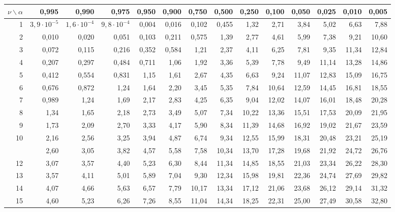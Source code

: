 \documentclass[12pt,a4paper]{article}
\begin{document}
\begin{center}
\footnotesize
\setlength{\tabcolsep}{2pt}
\begin{tabular*}{\linewidth}{@{\extracolsep{\fill}}rrrrrrrrrrrrrr@{}}
\toprule
$\nu \backslash \alpha$ & 0,995 & 0,990 & 0,975 & 0,950 & 0,900 & 0,750 & 0,500 & 0,250 & 0,100 & 0,050 & 0,025 & 0,010 & 0,005 \\
\midrule
1 & $3{,}9{\cdot}10^{-5}$ & $1{,}6{\cdot}10^{-4}$ & $9{,}8{\cdot}10^{-4}$ & 0,004 & 0,016 & 0,102 & 0,455 & 1,32 & 2,71 & 3,84 & 5,02 & 6,63 & 7,88 \\
2 & 0,010 & 0,020 & 0,051 & 0,103 & 0,211 & 0,575 & 1,39 & 2,77 & 4,61 & 5,99 & 7,38 & 9,21 & 10,60 \\
3 & 0,072 & 0,115 & 0,216 & 0,352 & 0,584 & 1,21 & 2,37 & 4,11 & 6,25 & 7,81 & 9,35 & 11,34 & 12,84 \\
4 & 0,207 & 0,297 & 0,484 & 0,711 & 1,06 & 1,92 & 3,36 & 5,39 & 7,78 & 9,49 & 11,14 & 13,28 & 14,86 \\
5 & 0,412 & 0,554 & 0,831 & 1,15 & 1,61 & 2,67 & 4,35 & 6,63 & 9,24 & 11,07 & 12,83 & 15,09 & 16,75 \\
6 & 0,676 & 0,872 & 1,24 & 1,64 & 2,20 & 3,45 & 5,35 & 7,84 & 10,64 & 12,59 & 14,45 & 16,81 & 18,55 \\
7 & 0,989 & 1,24 & 1,69 & 2,17 & 2,83 & 4,25 & 6,35 & 9,04 & 12,02 & 14,07 & 16,01 & 18,48 & 20,28 \\
8 & 1,34 & 1,65 & 2,18 & 2,73 & 3,49 & 5,07 & 7,34 & 10,22 & 13,36 & 15,51 & 17,53 & 20,09 & 21,95 \\
9 & 1,73 & 2,09 & 2,70 & 3,33 & 4,17 & 5,90 & 8,34 & 11,39 & 14,68 & 16,92 & 19,02 & 21,67 & 23,59 \\
10 & 2,16 & 2,56 & 3,25 & 3,94 & 4,87 & 6,74 & 9,34 & 12,55 & 15,99 & 18,31 & 20,48 & 23,21 & 25,19 \\
\addlinespace[2pt]
11 & 2,60 & 3,05 & 3,82 & 4,57 & 5,58 & 7,58 & 10,34 & 13,70 & 17,28 & 19,68 & 21,92 & 24,72 & 26,76 \\
12 & 3,07 & 3,57 & 4,40 & 5,23 & 6,30 & 8,44 & 11,34 & 14,85 & 18,55 & 21,03 & 23,34 & 26,22 & 28,30 \\
13 & 3,57 & 4,11 & 5,01 & 5,89 & 7,04 & 9,30 & 12,34 & 15,98 & 19,81 & 22,36 & 24,74 & 27,69 & 29,82 \\
14 & 4,07 & 4,66 & 5,63 & 6,57 & 7,79 & 10,17 & 13,34 & 17,12 & 21,06 & 23,68 & 26,12 & 29,14 & 31,32 \\
15 & 4,60 & 5,23 & 6,26 & 7,26 & 8,55 & 11,04 & 14,34 & 18,25 & 22,31 & 25,00 & 27,49 & 30,58 & 32,80 \\

\end{tabular*}
\end{center}
\end{document}
